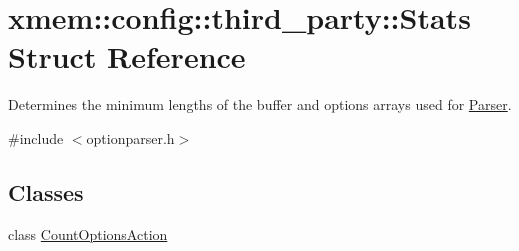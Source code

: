 \hypertarget{structxmem_1_1config_1_1third__party_1_1_stats}{\section{xmem\-:\-:config\-:\-:third\-\_\-party\-:\-:Stats Struct Reference}
\label{structxmem_1_1config_1_1third__party_1_1_stats}
}


Determines the minimum lengths of the buffer and options arrays used for \hyperlink{classxmem_1_1config_1_1third__party_1_1_parser}{Parser}.  




{\ttfamily \#include $<$optionparser.\-h$>$}

\subsection*{Classes}
\begin{DoxyCompactItemize}
\item 
class \hyperlink{classxmem_1_1config_1_1third__party_1_1_stats_1_1_count_options_action}{Count\-Options\-Action}
\end{DoxyCompactItemize}
